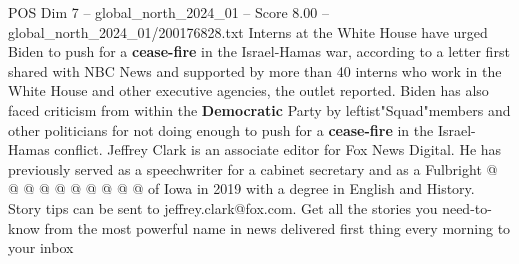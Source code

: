 \begin{textsample}{POS Dim 7 – global\_north\_2024\_01 – Score 8.00 – global\_north\_2024\_01/200176828.txt}
Interns at the White House have urged Biden to push for a \textbf{cease-fire} in the Israel-Hamas war, according to a letter first shared with NBC News and supported by more than 40 interns who work in the White House and other executive agencies, the outlet reported.
Biden has also faced criticism from within the \textbf{Democratic} Party by leftist"Squad"members and other politicians for not doing enough to push for a \textbf{cease-fire} in the Israel-Hamas conflict.
Jeffrey Clark is an associate editor for Fox News Digital.
He has previously served as a speechwriter for a cabinet secretary and as a Fulbright @ @ @ @ @ @ @ @ @ @ of Iowa in 2019 with a degree in English and History.
Story tips can be sent to jeffrey.clark@fox.com.
Get all the stories you need-to-know from the most powerful name in news delivered first thing every morning to your inbox

\end{textsample}
